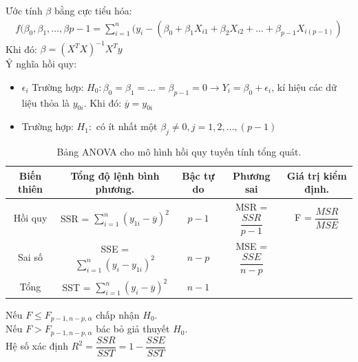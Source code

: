 \documentclass[a4paper]{article}
\newcommand{\gachdau}{\hspace*{1.5em}\ignorespaces}
\begin{document}
            Ước tính $\beta$ bằng cực tiểu hóa:\\
            \vspace{-18pt}
            \begin{align*}
                f(\beta_0, \beta_1, \ldots, \beta{p-1} = \sum_{i=1}^{n}(y_i - (\beta_0 + \beta_1X_{i1} + \beta_2X_{i2} + ... + \beta_{p-1}X_{i(p-1)})
            \end{align*}
            \gachdau
            Khi đó: $\beta = (X^TX)^{-1}X^Ty$\\
            \gachdau
            Ý nghĩa hồi quy:
            \begin{itemize}[leftmargin=3em, itemsep=-1.5em, parsep=1.6em]
                \vspace{-8pt}
                \item \fontsize{13pt}{15pt}\selectfont $\epsilon_i$ Trường hợp: $H_0: \beta_0 = \beta_1 = \ldots = \beta_{p-1} = 0 \rightarrow Y_i = \beta_0 + \epsilon_i$, kí hiệu các dữ liệu thỏa là $y_{0i}$. Khi đó: $\overline{y} = y_{0i}$
                \item \fontsize{13pt}{15pt}\selectfont Trường hợp: $H_1:$ có ít nhất một $\beta_j \neq 0, j = 1, 2, \ldots, (p-1)$
            \end{itemize}
            \begin{table}[h]
                \centering
                \setlength{\extrarowheight}{11pt}
                \begin{tabular}{|c|c|c|c|c|}
                    \hline
                    Biến thiên & Tổng độ lệnh bình phương. & Bậc tự do & Phương sai & Giá trị kiểm định. \\
                    \hline
                    Hồi quy & SSR = $\sum_{i=1}^{n}(y_{1i} - \overline{y})^2$ & $p-1$ & MSR = $\dfrac{SSR}{p-1}$ & F = $\dfrac{MSR}{MSE}$\\
                    \hline
                    Sai số & SSE = $\sum_{i=1}^{n}(y_{i}-y_{1i})^2$ & $n-p$ & MSE = $\dfrac{SSE}{n-p}$ & \\ \hline
                    Tổng & SST = $\sum_{i=1}^{n}(y_{i}-\overline{y})^2$ & $n-1$ & & \\
                    \hline
                \end{tabular}
                \caption{Bảng ANOVA cho mô hình hồi quy tuyến tính tổng quát.}
            \end{table}
            \vspace{-13pt}
            \gachdau
            Nếu $F \leq F_{p-1,n-p,\alpha} $ chấp nhận $H_0$.\\
            \gachdau
            Nếu $F > F_{p-1,n-p,\alpha} $ bác bỏ giả thuyết $H_0$.\\
            \gachdau
            Hệ số xác định $R^2 = \dfrac{SSR}{SST} = 1 - \dfrac{SSE}{SST}$
\end{document}
